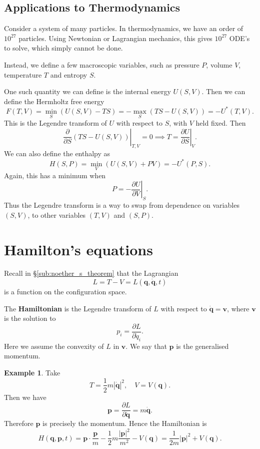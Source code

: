 \documentclass[12pt]{article}
\theoremstyle{definition}
\newtheorem{example}{Example}[section]
\theoremstyle{remark}
\begin{document}
\subsection{Applications to Thermodynamics}%
\label{sub:applications_to_thermodynamics}

Consider a system of many particles. In thermodynamics, we have an order of $10^{27}$ particles. Using Newtonian or Lagrangian mechanics, this gives $10^{27}$ ODE's to solve, which simply cannot be done.

Instead, we define a few macroscopic variables, such as pressure $P$, volume $V$, temperature $T$ and entropy $S$.

One such quantity we can define is the internal energy $U(S, V)$. Then we can define the Hermholtz free energy
\[
	F(T, V) = \min_{S}(U(S, V) - TS) = -\max_{S}(TS - U(S, V)) = -U^{\ast}(T, V)
.\]
This is the Legendre transform of $U$ with respect to $S$, with $V$ held fixed. Then
\[
	\left.\frac{\partial}{\partial S}(TS - U(S, V))\right|_{T, V} = 0 \implies T = \left.\frac{\partial U}{\partial S}\right|_{V}
.\] 
We can also define the enthalpy as
\[
	H(S, P) = \min_{V}(U(S, V) + PV) = -U^{\ast}(P, S)
.\]
Again, this has a minimum when
\[
	P = -\left. \frac{\partial U}{\partial V} \right|_{S}
.\]
Thus the Legendre transform is a way to swap from dependence on variables $(S, V)$, to other variables $(T, V)$ and $(S, P)$.

\newpage

\section{Hamilton's equations}%
\label{sec:hamilton_s_equations}

Recall in \S\eqref{sub:noether_s_theorem} that the Lagrangian
\[
	L = T - V = L(\mathbf{q}, \mathbf{\dot q}, t)
\]
is a function on the configuration space.

The \textbf{Hamiltonian} is the Legendre transform of $L$ with respect to $\mathbf{\dot q} = \mathbf{v}$, where $\mathbf{v}$ is the solution to
\[
p_i = \frac{\partial L}{\partial \dot q_i}
.\]
Here we assume the convexity of $L$ in $\mathbf{v}$. We say that $\mathbf{p}$ is the generalised momentum.

\begin{adjustbox}{minipage = \columnwidth - 25.5pt, margin=1em, frame=1pt, margin=0em}
\begin{example}
	Take
	\[
		T = \frac{1}{2} m |\mathbf{\dot q}|^2, \quad V = V(\mathbf{q})
	.\]
	Then we have
	\[
	\mathbf{p} = \frac{\partial L}{\partial \mathbf{\dot q}} = m \mathbf{\dot q}
	.\]
	Therefore $\mathbf{p}$ is precisely the momentum. Hence the Hamiltonian is
	\[
		H(\mathbf{q}, \mathbf{p}, t) = \mathbf{p} \cdot \frac{\mathbf{p}}{m} - \frac{1}{2}m \frac{|\mathbf{p}|^2}{m^2} - V(\mathbf{q}) = \frac{1}{2m} |\mathbf{p}|^2 + V(\mathbf{q})
	.\]
\end{example}
\end{adjustbox}
\end{document}
